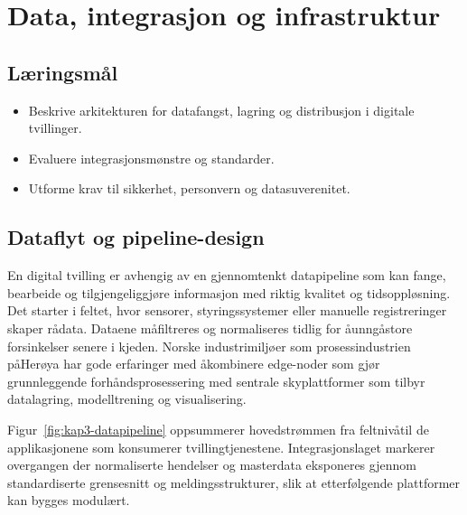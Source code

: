 \chapter{Data, integrasjon og infrastruktur}

\section{L\ae ringsm\aa l}
\begin{itemize}
    \item Beskrive arkitekturen for datafangst, lagring og distribusjon i digitale tvillinger.
    \item Evaluere integrasjonsm\o nstre og standarder.
    \item Utforme krav til sikkerhet, personvern og datasuverenitet.
\end{itemize}

\section{Dataflyt og pipeline-design}
En digital tvilling er avhengig av en gjennomtenkt datapipeline som kan fange, bearbeide og tilgjengeliggj\o re informasjon med riktig kvalitet og tidsoppl\o sning. Det starter i feltet, hvor sensorer, styringssystemer eller manuelle registreringer skaper r\aa data. Dataene m\aa filtreres og normaliseres tidlig for \aa unng\aa store forsinkelser senere i kjeden. Norske industrimilj\o er som prosessindustrien p\aa Her\o ya har gode erfaringer med \aa kombinere edge-noder som gj\o r grunnleggende forh\aa ndsprosessering med sentrale skyplattformer som tilbyr datalagring, modelltrening og visualisering.

Figur~\ref{fig:kap3-datapipeline} oppsummerer hovedstr\o mmen fra feltniv\aa til de applikasjonene som konsumerer tvillingtjenestene. Integrasjonslaget markerer overgangen der normaliserte hendelser og masterdata eksponeres gjennom standardiserte grensesnitt og meldingsstrukturer, slik at etterf\o lgende plattformer kan bygges modul\ae rt.

